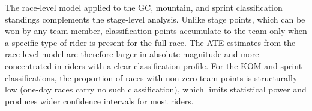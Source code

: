 The race-level model applied to the GC, mountain, and sprint classification standings complements the stage-level analysis. Unlike stage points, which can be won by any team member, classification points accumulate to the team only when a specific type of rider is present for the full race. The ATE estimates from the race-level model are therefore larger in absolute magnitude and more concentrated in riders with a clear classification profile. For the KOM and sprint classifications, the proportion of races with non-zero team points is structurally low (one-day races carry no such classification), which limits statistical power and produces wider confidence intervals for most riders.
